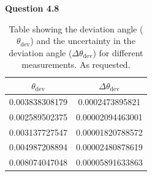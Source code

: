 \documentclass[a4paper,12pt]{article}
\begin{document}
\noindent \textbf{\LARGE Question 4.8}

\vspace{0.2cm}

\begin{table}[h]
    \centering
    \begin{tabular}{cc}
        \toprule
        $\theta_{\text{dev}}$ & $\Delta \theta_{\text{dev}}$ \\
        \midrule
        0.003838308179 & 0.0002473895821 \\
        0.002589502375 & 0.00002094463001 \\
        0.003137727547 & 0.00001820788572 \\
        0.004987208894 & 0.00002480878619 \\
        0.008074047048 & 0.00005891633863 \\
        \bottomrule
    \end{tabular}
    \caption{Table showing the deviation angle ($\theta_{\text{dev}}$) and the uncertainty in the deviation angle ($\Delta \theta_{\text{dev}}$) for different measurements. As requested.}
    \label{tab:deviation_uncertainty}
\end{table}
\end{document}
